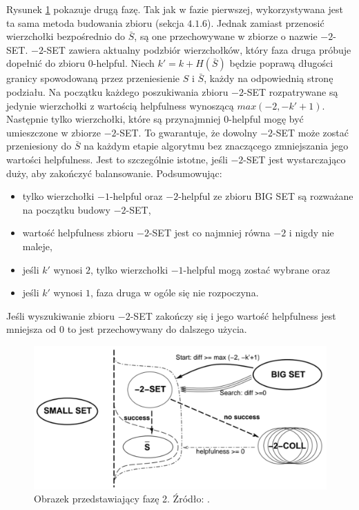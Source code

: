 Rysunek \ref{im:phase_2} pokazuje drugą fazę.
Tak jak w fazie pierwszej, wykorzystywana jest ta sama metoda budowania zbioru (sekcja $4.1.6$).
Jednak zamiast przenosić wierzchołki bezpośrednio do $\bar{S}$, są one przechowywane w zbiorze o nazwie $-2$-SET.
$-2$-SET zawiera aktualny podzbiór wierzchołków, który faza druga próbuje dopełnić do zbioru $0$-helpful.
Niech $k' = k + H(\bar{S})$ będzie poprawą długości granicy spowodowaną przez przeniesienie $S$ i $\bar{S}$, każdy
na odpowiednią stronę podziału.
Na początku każdego poszukiwania zbioru $-2$-SET rozpatrywane są jedynie wierzchołki z wartością helpfulness wynoszącą
$max(-2, -k'+1)$.
Następnie tylko wierzchołki, które są przynajmniej $0$-helpful mogę być umieszczone w zbiorze $-2$-SET.
To gwarantuje, że dowolny $-2$-SET może zostać przeniesiony do $\bar{S}$ na każdym etapie algorytmu bez znaczącego
zmniejszania jego wartości helpfulness.
Jest to szczególnie istotne, jeśli $-2$-SET jest wystarczająco duży, aby zakończyć balansowanie.
Podsumowując:
\begin{itemize}
    \item {tylko wierzchołki $-1$-helpful oraz $-2$-helpful ze zbioru BIG SET są rozważane na początku budowy $-2$-SET,}
    \item wartość helpfulness zbioru $-2$-SET jest co najmniej równa $-2$ i nigdy nie maleje,
    \item jeśli $k'$ wynosi $2$, tylko wierzchołki $-1$-helpful mogą zostać wybrane oraz
    \item jeśli $k'$ wynosi $1$, faza druga w ogóle się nie rozpoczyna.
\end{itemize}

Jeśli wyszukiwanie zbioru $-2$-SET zakończy się i jego wartość helpfulness jest mniejsza od $0$ to jest przechowywany
do dalszego użycia.
\begin{figure}[h]
    \centering
    \includegraphics[width=0.65\linewidth]{images/phase2}
    \caption{Obrazek przedstawiający fazę 2. Źródło: \cite{article}.}
    \label{im:phase_2}
\end{figure}
\newpage

